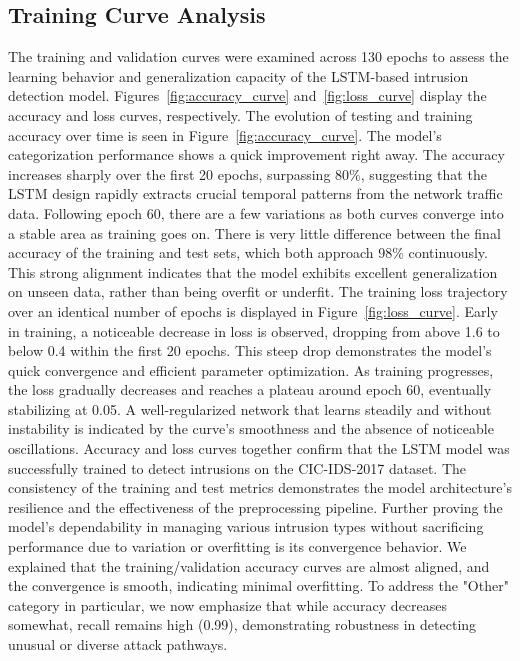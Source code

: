\documentclass[conference]{IEEEtran}
\begin{document}
\subsection{Training Curve Analysis}
The training and validation curves were examined across 130 epochs to assess the learning behavior and generalization capacity of the LSTM-based intrusion detection model. Figures~\ref{fig:accuracy_curve} and~\ref{fig:loss_curve} display the accuracy and loss curves, respectively.
The evolution of testing and training accuracy over time is seen in Figure~\ref{fig:accuracy_curve}. The model's categorization performance shows a quick improvement right away. The accuracy increases sharply over the first 20 epochs, surpassing 80\%, suggesting that the LSTM design rapidly extracts crucial temporal patterns from the network traffic data. Following epoch 60, there are a few variations as both curves converge into a stable area as training goes on. There is very little difference between the final accuracy of the training and test sets, which both approach 98\% continuously. This strong alignment indicates that the model exhibits excellent generalization on unseen data, rather than being overfit or underfit.
The training loss trajectory over an identical number of epochs is displayed in Figure~\ref{fig:loss_curve}. Early in training, a noticeable decrease in loss is observed, dropping from above 1.6 to below 0.4 within the first 20 epochs. This steep drop demonstrates the model's quick convergence and efficient parameter optimization. As training progresses, the loss gradually decreases and reaches a plateau around epoch 60, eventually stabilizing at 0.05. A well-regularized network that learns steadily and without instability is indicated by the curve's smoothness and the absence of noticeable oscillations.
Accuracy and loss curves together confirm that the LSTM model was successfully trained to detect intrusions on the CIC-IDS-2017 dataset. The consistency of the training and test metrics demonstrates the model architecture's resilience and the effectiveness of the preprocessing pipeline. Further proving the model's dependability in managing various intrusion types without sacrificing performance due to variation or overfitting is its convergence behavior. We explained that the training/validation accuracy curves are almost aligned, and the convergence is smooth, indicating minimal overfitting.  To address the "Other" category in particular, we now emphasize that while accuracy decreases somewhat, recall remains high (0.99), demonstrating robustness in detecting unusual or diverse attack pathways. 
\end{document}
